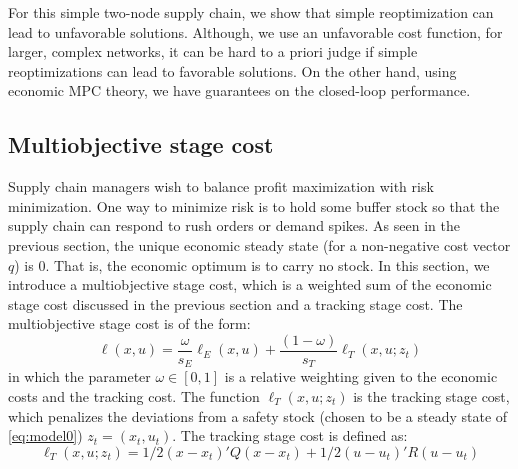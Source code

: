 \documentclass{elsarticle}
\theoremstyle{definition}
\begin{document}
For this simple two-node supply chain, we show that simple
reoptimization can lead to unfavorable solutions. Although, we use an
unfavorable cost function, for larger, complex networks, it can be
hard to a priori judge if simple reoptimizations can lead to favorable
solutions. On the other hand, using economic MPC theory, we have
guarantees on the closed-loop performance. 

\subsection{Multiobjective stage cost}
\label{sec:multiobj}
Supply chain managers wish to balance profit maximization with 
risk minimization. One way to minimize risk is to hold some buffer
stock so that the supply chain can respond to rush orders or demand
spikes. As seen in the previous section, the unique economic steady
state (for a non-negative cost vector $q$) is ${0}$. That
is, the economic optimum is to carry no stock. In this section, we
introduce a multiobjective stage cost, which is a weighted sum of the
economic stage cost discussed in the previous section and a tracking
stage cost. The multiobjective stage cost is of the form:
\begin{equation}
\label{eq:esc:ell}
\ell(x,u) = \frac{\omega}{s_E} \ell_E(x,u) + \frac{(1-\omega)}{s_T} \ell_T(x,u;z_t)
\end{equation}
in which the parameter $\omega \in [0,1]$ is a relative weighting
given to the economic costs and the tracking cost. The function
$\ell_T(x,u;z_t)$ is the tracking stage cost, which penalizes the
deviations from a safety stock (chosen to be a steady state of
\eqref{eq:model0}) $z_t = (x_t,u_t)$. The tracking stage cost
is defined as:
\begin{equation}
\label{eq:esc:ellT}
\ell_T(x,u;z_t) = 1/2(x-x_t)'Q(x-x_t)+ 1/2(u-u_t)'R(u-u_t)
\end{equation} 
\end{document}
